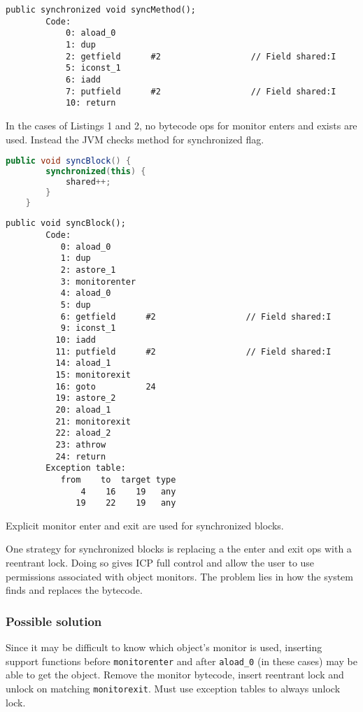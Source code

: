 \documentclass[11pt]{article}
\begin{document}
    \begin{lstlisting}[language=JVMIS, caption=Bytecode for Listings 1]
    public synchronized void syncMethod();
        Code:
            0: aload_0
            1: dup
            2: getfield      #2                  // Field shared:I
            5: iconst_1
            6: iadd
            7: putfield      #2                  // Field shared:I
            10: return
    \end{lstlisting}

    In the cases of Listings 1 and 2, no bytecode ops for monitor enters and exists are used.
    Instead the JVM checks method for synchronized flag.

    \begin{lstlisting}[language=java]
    public void syncBlock() {
        synchronized(this) {
            shared++;
        }
    }
    \end{lstlisting}

    \begin{lstlisting}[language=JVMIS]
    public void syncBlock();
        Code:
           0: aload_0
           1: dup
           2: astore_1
           3: monitorenter
           4: aload_0
           5: dup
           6: getfield      #2                  // Field shared:I
           9: iconst_1
          10: iadd
          11: putfield      #2                  // Field shared:I
          14: aload_1
          15: monitorexit
          16: goto          24
          19: astore_2
          20: aload_1
          21: monitorexit
          22: aload_2
          23: athrow
          24: return
        Exception table:
           from    to  target type
               4    16    19   any
              19    22    19   any
    \end{lstlisting}

    Explicit monitor enter and exit are used for synchronized blocks.

    One strategy for synchronized blocks is replacing a the enter and exit ops with a reentrant lock. Doing so gives
    ICP full control and allow the user to use permissions associated with object monitors. The problem lies in how
    the system finds and replaces the bytecode.

    \subsubsection{Possible solution}
    Since it may be difficult to know which object's monitor is used, inserting support functions before
    \lstinline{monitorenter} and after \lstinline{aload_0} (in these cases) may be able to get the object.
    Remove the monitor bytecode, insert reentrant lock and unlock on matching \lstinline{monitorexit}. Must use
    exception tables to always unlock lock.
\end{document}
